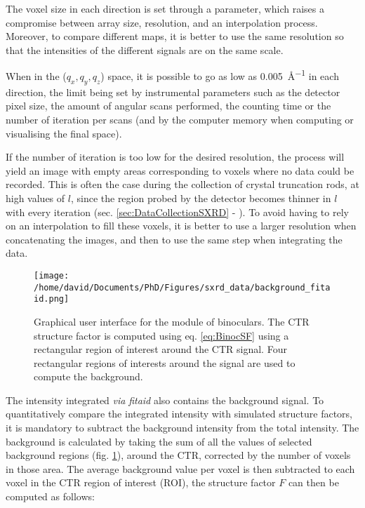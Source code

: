 The voxel size in each direction is set through a parameter, which raises a compromise between array size, resolution, and an interpolation process.
Moreover, to compare different maps, it is better to use the same resolution so that the intensities of the different signals are on the same scale.

When in the ($q_x, q_y, q_z$) space, it is possible to go as low as \qty{0.005}{\angstrom^{-1}} in each direction, the limit being set by instrumental parameters such as the detector pixel size, the amount of angular scans performed, the counting time or the number of iteration per scans (and by the computer memory when computing or visualising the final space).

If the number of iteration is too low for the desired resolution, the process will yield an image with empty areas corresponding to voxels where no data could be recorded.
This is often the case during the collection of crystal truncation rods, at high values of $l$, since the region probed by the detector becomes thinner in $l$ with every iteration (sec. \ref{sec:DataCollectionSXRD} - \cite{Drnec2014}).
To avoid having to rely on an interpolation to fill these voxels, it is better to use a larger resolution when concatenating the images, and then to use the same step when integrating the data.

\begin{figure}[!htb]
    \texttt{[image: /home/david/Documents/PhD/Figures/sxrd\_data/background\_fitaid.png]}
    \caption{
        Graphical user interface for the  module of binoculars.
        The CTR structure factor is computed using eq. \ref{eq:BinocSF} using a rectangular region of interest around the CTR signal.
        Four rectangular regions of interests around the signal are used to compute the background.
    }
    \label{fig:BinocularsBackground}
\end{figure}

The intensity integrated \textit{via} \textit{fitaid} also contains the background signal.
To quantitatively compare the integrated intensity with simulated structure factors, it is mandatory to subtract the background intensity from the total intensity.
The background is calculated by taking the sum of all the values of selected background regions (fig. \ref{fig:BinocularsBackground}), around the CTR, corrected by the number of voxels in those area.
The average background value per voxel is then subtracted to each voxel in the CTR region of interest (ROI), the structure factor $F$ can then be computed as follows:


